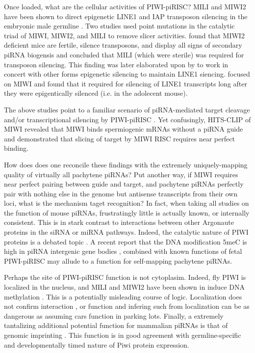 {    Once loaded, what are the cellular activities of PIWI-piRISC? MILI and MIWI2 have been shown to direct epigenetic LINE1 and IAP transposon silencing in the embryonic male germline \citep{Aravin2007,Carmell2007,Kuramochi-Miyagawa2008}. Two studies \citep{DeFazio2011,Reuter2011} used point mutations in the catalytic triad of MIWI, MIWI2, and MILI to remove slicer activities. \citet{DeFazio2011} found that MIWI2 deficient mice are fertile, silence transposons, and display all signs of secondary piRNA biogensis and concluded that MILI (which were sterile) was required for transposon silencing. This finding was later elaborated upon by \citet{DiGiacomo2013} to work in concert with other forms epigenetic silencing to maintain LINE1 siencing. \citet{Reuter2011} focused on MIWI and found that it required for silencing of LINE1 transcripts long after they were epigentically silenced (i.e. in the adolecent mouse).

    The above studies point to a familiar scenario of piRNA-mediated target cleavage and/or transcriptional silencing by PIWI-piRISC \citep{Meister2013}. Yet confusingly, HITS-CLIP of MIWI revealed that MIWI binds spermiogenic mRNAs without a piRNA guide \citep{Vourekas2012} and \citet{Reuter2011} demonstrated that slicing of target by MIWI RISC requires near perfect binding.
    
    How does does one reconcile these findings with the extremely uniquely-mapping quality of virtually all pachytene piRNAs? Put another way, if MIWI requires near perfect pairing between guide and target, and pachytene piRNAs perfectly pair with nothing else in the genome but antisense transcripts from their own loci, what is the mechanism taget recognition? In fact, when taking all studies on the function of mouse piRNAs, frustratingly little is actually known, or internally consistent. This is in stark contrast to interactions between other Argonaute proteins in the siRNA or miRNA pathways. Indeed, the catalytic nature of PIWI proteins is a debated topic \citep{Luteijn2013,Meister2013}. A recent report that the DNA modification 5meC is high in piRNA intergenic gene bodies \citep{Gan2013}, combined with known functions of fetal PIWI-piRISC may allude to a function for self-mapping pachytene piRNAs.

    Perhaps the site of PIWI-piRISC function is not cytoplasim. Indeed, fly PIWI is localized in the nucleus, and MILI and MIWI2 have been shown in induce DNA methylation \citep{Cox2000,Aravin2008}. This is a potentially misleading course of logic. Localization does not confirm interaction \citep{North2006}, or function and infering such from localization can be as dangerous as assuming cars function in parking lots. Finally, a extremely tantalizing additional potential function for mammalian piRNAs is that of genomic imprinting \citep{Watanabe2011}. This function is in good agreement with germline-specific and developmentally timed nature of Piwi protein expression.

}
